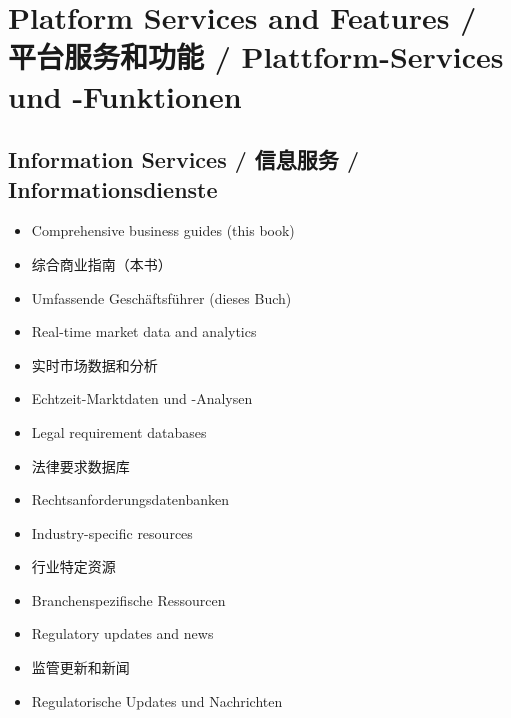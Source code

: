 \section{Platform Services and Features / 平台服务和功能 / Plattform-Services und -Funktionen}

\subsection{Information Services / 信息服务 / Informationsdienste}
\begin{itemize}
    \item Comprehensive business guides (this book)
    \item 综合商业指南（本书）
    \item Umfassende Geschäftsführer (dieses Buch)
    \item Real-time market data and analytics
    \item 实时市场数据和分析
    \item Echtzeit-Marktdaten und -Analysen
    \item Legal requirement databases
    \item 法律要求数据库
    \item Rechtsanforderungsdatenbanken
    \item Industry-specific resources
    \item 行业特定资源
    \item Branchenspezifische Ressourcen
    \item Regulatory updates and news
    \item 监管更新和新闻
    \item Regulatorische Updates und Nachrichten
\end{itemize}

